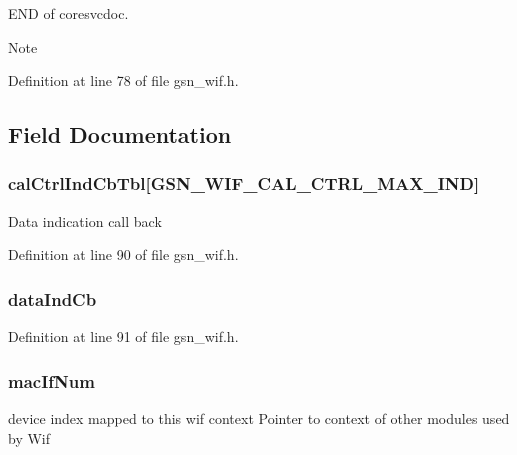 END of coresvcdoc.

\begin{DoxyNote}{Note}

\end{DoxyNote}


Definition at line 78 of file gsn\_\-wif.h.



\subsection{Field Documentation}
\hypertarget{a00323_a4964ff7aaa3b18e3676bf5d6781b710a}{
\subsubsection[{calCtrlIndCbTbl}]{ {\bf calCtrlIndCbTbl}\mbox{[}GSN\_\-WIF\_\-CAL\_\-CTRL\_\-MAX\_\-IND\mbox{]}}}
\label{a00323_a4964ff7aaa3b18e3676bf5d6781b710a}
Data indication call back 

Definition at line 90 of file gsn\_\-wif.h.

\hypertarget{a00323_a0a90ad3e7a8afda41c61fef59c158b79}{
\subsubsection[{dataIndCb}]{ {\bf dataIndCb}}}
\label{a00323_a0a90ad3e7a8afda41c61fef59c158b79}


Definition at line 91 of file gsn\_\-wif.h.

\hypertarget{a00323_ae57ae92e651751e7978e237c55133b4c}{
\subsubsection[{macIfNum}]{ {\bf macIfNum}}}
\label{a00323_ae57ae92e651751e7978e237c55133b4c}
device index mapped to this wif context Pointer to context of other modules used by Wif 

